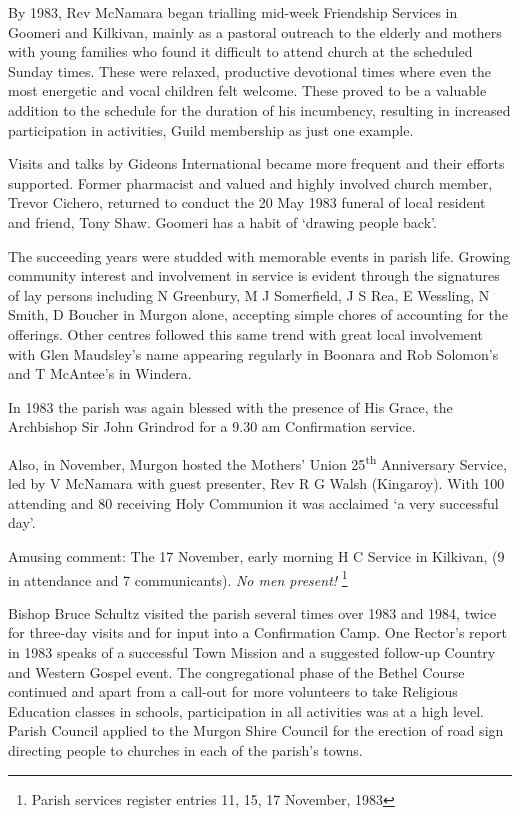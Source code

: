 By 1983, Rev McNamara began trialling mid-week Friendship Services in Goomeri and Kilkivan, mainly as a pastoral outreach to the elderly and mothers with young families who found it difficult to attend church at the scheduled Sunday times. These were relaxed, productive devotional times where even the most energetic and vocal children felt welcome. These proved to be a valuable addition to the schedule for the duration of his incumbency, resulting in increased participation in activities, Guild membership as just one example.



Visits and talks by Gideons International became more frequent and their efforts supported. Former pharmacist and valued and highly involved church member, Trevor Cichero, returned to conduct the 20 May 1983 funeral of local resident and friend, Tony Shaw. Goomeri has a habit of `drawing people back'.



The succeeding years were studded with memorable events in parish life. Growing community interest and involvement in service is evident through the signatures of lay persons including N Greenbury, M J Somerfield, J S Rea, E Wessling, N Smith, D Boucher in Murgon alone, accepting simple chores of accounting for the offerings. Other centres followed this same trend with great local involvement with Glen Maudsley's name appearing regularly in Boonara and Rob Solomon's and T McAntee's in Windera.



In 1983 the parish was again blessed with the presence of His Grace, the Archbishop Sir John Grindrod for a 9.30 am Confirmation service.



Also, in November, Murgon hosted the Mothers' Union 25\textsuperscript{th} Anniversary Service, led by V McNamara with guest presenter, Rev R G Walsh (Kingaroy). With 100 attending and 80 receiving Holy Communion it was acclaimed `a very successful day'.



Amusing comment: The 17 November, early morning H C Service in Kilkivan, (9 in attendance and 7 communicants). \emph{No men present!} \footnote{Parish services register entries 11, 15, 17 November, 1983}


Bishop Bruce Schultz visited the parish several times over 1983 and 1984, twice for three-day visits and for input into a Confirmation Camp. One Rector's report in 1983 speaks of a successful Town Mission and a suggested follow-up Country and Western Gospel event. The congregational phase of the Bethel Course continued and apart from a call-out for more volunteers to take Religious Education classes in schools, participation in all activities was at a high level. Parish Council applied to the Murgon Shire Council for the erection of road sign directing people to churches in each of the parish's towns.



